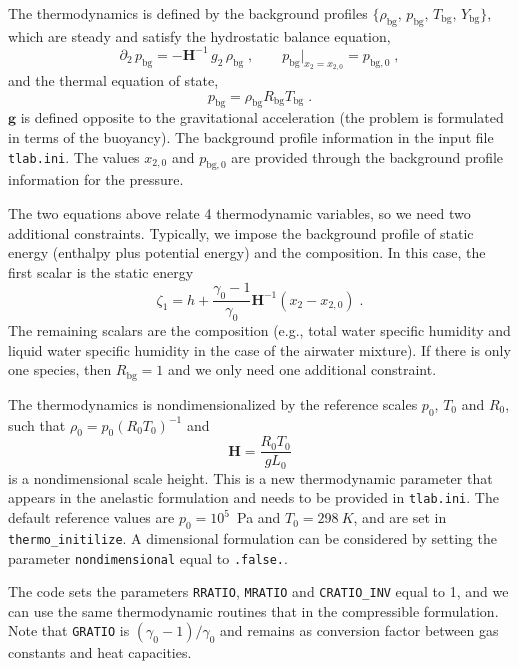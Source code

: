 The thermodynamics is defined by the background profiles $\{\rho_\mathrm{bg},\, p_\mathrm{bg},\, T_\mathrm{bg},\, Y_\mathrm{bg}\}$, which are steady and satisfy the hydrostatic balance equation,
\begin{equation}
    \partial_2\,p_\mathrm{bg}=-\mathbf{H}^{-1}\, g_2\,\rho_\mathrm{bg}\;,\qquad p_\mathrm{bg}|_{x_2=x_{2,0}}=p_{\mathrm{bg},0}\;,
\end{equation}
and the thermal equation of state,
\begin{equation}
    p_\mathrm{bg}  = \rho_\mathrm{bg} R_\mathrm{bg} T_\mathrm{bg} \;.
\end{equation}
$\mathbf{g}$ is defined opposite to the gravitational acceleration (the problem is formulated in terms of the buoyancy). The background profile information in the input file {\tt tlab.ini}. The values $x_{2,0}$ and $p_\mathrm{bg,0}$ are provided through the background profile information for the pressure. 

The two equations above relate 4 thermodynamic variables, so we need two additional constraints. Typically, we impose the background profile of static energy (enthalpy plus potential energy) and the composition. In this case, the first scalar is the static energy
\begin{equation}
    \zeta_1 = h + \frac{\gamma_0-1}{\gamma_0}\mathbf{H}^{-1}(x_2-x_{2,0}) \;.
\end{equation}
The remaining scalars are the composition (e.g., total water specific humidity and liquid water specific humidity in the case of the airwater mixture). If there is only one species, then $R_\mathrm{bg}=1$ and we only need one additional constraint. 

The thermodynamics is nondimensionalized by the reference scales $p_0$, $T_0$ and $R_0$, such that $\rho_0=p_0(R_0T_0)^{-1}$ and
\begin{equation}
    \mathbf{H} = \frac{R_0T_0}{gL_0}
\end{equation}
is a nondimensional scale height. This is a new thermodynamic parameter that appears in the anelastic formulation and needs to be provided in \texttt{tlab.ini}. The default reference values are $p_0=10^5$~Pa and $T_0=298~K$, and are set in \texttt{thermo\_initilize}. A dimensional formulation can be considered by setting the parameter \texttt{nondimensional} equal to \texttt{.false.}.

The code sets the parameters \texttt{RRATIO}, \texttt{MRATIO} and \texttt{CRATIO\_INV} equal to 1, and we can use the same thermodynamic routines that in the compressible formulation. Note that \texttt{GRATIO} is $(\gamma_0-1)/\gamma_0$ and remains as conversion factor between gas constants and heat capacities.


